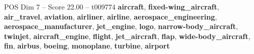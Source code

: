 \begin{textsample}{POS Dim 7 – Score 22.00 – t009774}  \label{ex:f7_pos_013}
\textbf{aircraft}, \textbf{fixed-wing\_aircraft}, \textbf{air\_travel}, \textbf{aviation}, \textbf{airliner}, \textbf{airline}, \textbf{aerospace\_engineering}, \textbf{aerospace\_manufacturer}, \textbf{jet\_engine}, \textbf{logo}, \textbf{narrow-body\_aircraft}, \textbf{twinjet}, \textbf{aircraft\_engine}, \textbf{flight}, \textbf{jet\_aircraft}, \textbf{flap}, \textbf{wide-body\_aircraft}, \textbf{fin}, \textbf{airbus}, \textbf{boeing}, \textbf{monoplane}, \textbf{turbine}, \textbf{airport}

\end{textsample}
